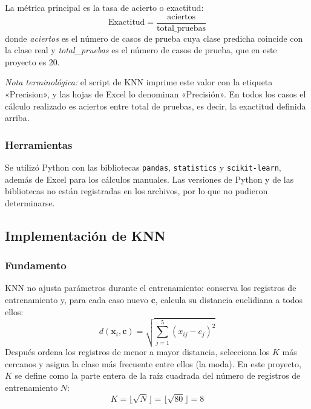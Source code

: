 \documentclass[]{article}
\begin{document}
La métrica principal es la tasa de acierto o exactitud:
\begin{equation}
\text{Exactitud}=\frac{\text{aciertos}}{\text{total\_pruebas}}
\end{equation}
donde \emph{aciertos} es el número de casos de prueba cuya clase predicha coincide con la clase real y \emph{total\_pruebas} es el número de casos de prueba, que en este proyecto es 20.

\emph{Nota terminológica:} el script de KNN imprime este valor con la etiqueta «Precision», y las hojas de Excel lo denominan «Precisión». En todos los casos el cálculo realizado es aciertos entre total de pruebas, es decir, la exactitud definida arriba.

\subsubsection{Herramientas}

Se utilizó Python con las bibliotecas \texttt{pandas}, \texttt{statistics} y \texttt{scikit-learn}, además de Excel para los cálculos manuales. Las versiones de Python y de las bibliotecas no están registradas en los archivos, por lo que no pudieron determinarse.

\subsection{Implementación de KNN}

\subsubsection{Fundamento}

KNN no ajusta parámetros durante el entrenamiento: conserva los registros de entrenamiento y, para cada caso nuevo $\mathbf{c}$, calcula su distancia euclidiana a todos ellos:
\begin{equation}
d(\mathbf{x}_i,\mathbf{c})=\sqrt{\sum_{j=1}^{5}\left(x_{ij}-c_j\right)^2}
\end{equation}
Después ordena los registros de menor a mayor distancia, selecciona los $K$ más cercanos y asigna la clase más frecuente entre ellos (la moda). En este proyecto, $K$ se define como la parte entera de la raíz cuadrada del número de registros de entrenamiento $N$:
\begin{equation}
K=\lfloor\sqrt{N}\rfloor=\lfloor\sqrt{80}\rfloor=8
\end{equation}
\end{document}
